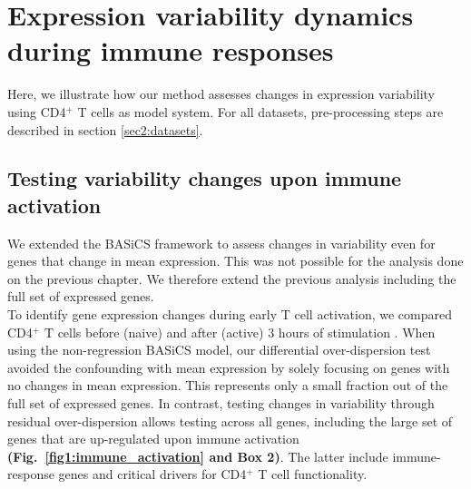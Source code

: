 \section{Expression variability dynamics during immune responses}

Here, we illustrate how our method assesses changes in expression variability using CD4$^+$ T cells as model system. For all datasets, pre-processing steps are described in section \ref{sec2:datasets}. 

\subsection{Testing variability changes upon immune activation}

We extended the BASiCS framework to assess changes in variability even for genes that change in mean expression. This was not possible for the analysis done on the previous chapter. We therefore extend the previous analysis including the full set of expressed genes. \\

To identify gene expression changes during early T cell activation, we compared CD4$^+$ T cells before (naive) and after (active) 3 hours of stimulation \citep{Martinez-jimenez2017}. When using the non-regression BASiCS model, our differential over-dispersion test avoided the confounding with mean expression by solely focusing on genes with no changes in mean expression. This represents only a small fraction 
out of the full set of expressed genes. In contrast, testing changes in variability through residual over-dispersion allows testing across all genes, including the large set of genes that are up-regulated upon immune activation \textbf{(Fig.~\ref{fig1:immune_activation} and Box 2)}. The latter include immune-response genes and critical drivers for CD4$^+$ T cell functionality.\\


